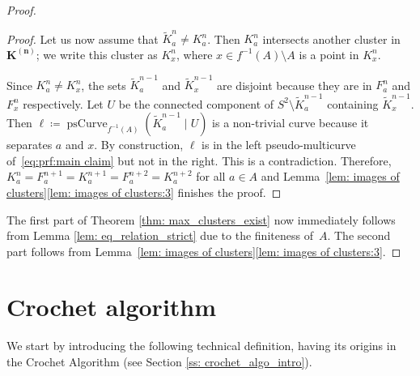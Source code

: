 \documentclass{amsart}
\theoremstyle{plain}
\theoremstyle{definition}
\theoremstyle{remark}
\newcommand{\CC}{{\mathcal C}}
\newcommand{\psCurve}{{\operatorname{psCurve}}}
\newcommand{\cro}{{\operatorname{dec}}}
\begin{document}
\begin{proof}
\begin{proof}
Let us now assume that $\widetilde K^{n}_a\not=K^n_a$. Then $K^{n}_a$ intersects another cluster in $\mathbf {K^{(n)}}$; we write this cluster as $K^n_x$, where $x\in f^{-1}(A)\setminus A$ is a point in $K^n_x$.

Since $K^n_a\not=K^n_x$, the sets $\widetilde K^{n-1}_a$ and $\widetilde K^{n-1}_x$ are disjoint because they are in $F^{n}_a$ and $F^{n}_x$ respectively. Let $U$ be the connected component of $S^2\setminus \widetilde K^{n-1}_a$ containing $\widetilde K^{n-1}_x$. Then $\ell\coloneq \psCurve_{f^{-1}(A)}(\widetilde K^{n-1}_a\mid U)$ is a non-trivial curve because it separates $a$ and $x$. By construction, $\ell$ is in the left pseudo-multicurve of~\eqref{eq:prf:main claim} but not in the right. This is a contradiction. Therefore, $K^n_a=F^{n+1}_a=K^{n+1}_a=F^{n+2}_a=K^{n+2}_a$ for all $a\in A$ and Lemma~\ref{lem: images of clusters}\ref{lem: images of clusters:3} finishes the proof.
\end{proof}




The first part of Theorem \ref{thm: max_clusters_exist} now immediately follows from Lemma \ref{lem: eq_relation_strict} due to the finiteness of~$A$. The second part follows from Lemma~\ref{lem: images of clusters}\ref{lem: images of clusters:3}. 
\end{proof}








\section{Crochet algorithm}
\label{sec: existence}



We start by introducing the following technical definition, having its origins in the Crochet Algorithm (see Section \ref{ss: crochet_algo_intro}).
\end{document}
